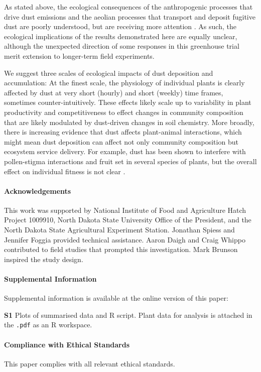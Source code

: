 \documentclass{svjour3}
\begin{document}
As stated above, the ecological consequences of the anthropogenic processes that drive dust emissions and the  aeolian processes that transport and deposit fugitive dust are poorly understood, but are receiving more attention \citep{field2010}. 
As such, the ecological implications of the results demonstrated here are equally unclear, although the unexpected direction of some responses in this greenhouse trial merit extension to longer-term field experiments. 

We suggest three scales of ecological impacts of dust deposition and accumulation: At the finest scale, the physiology of individual plants is clearly affected by dust at very short (hourly) and short (weekly) time frames, sometimes counter-intuitively. 
These effects likely scale up to variability in plant productivity and competitiveness to effect changes in community composition that are likely modulated by dust-driven changes in soil chemistry. 
More broadly, there is increasing evidence that dust affects plant-animal interactions, which might mean dust deposition can affect not only community composition but ecosystem service delivery. 
For example, dust has been shown to interfere with pollen-stigma interactions and fruit set in several species of plants, but the overall effect on individual fitness is not clear \citep{waser2016, zhang2019}. 


\paragraph{Acknowledgements}
This work was supported by National Institute of Food and Agriculture Hatch Project 1009910, North Dakota State University Office of the President, and the North Dakota State Agricultural Experiment Station.
Jonathan Spiess and Jennifer Foggia provided technical assistance. 
Aaron Daigh and Craig Whippo contributed to field studies that prompted this investigation.
Mark Brunson inspired the study design.

\paragraph{Supplemental Information}

Supplemental information is available at the online version of this paper:

\textbf{S1} Plots of summarised data and \textsf{R} script.
Plant data for analysis is attached in the \texttt{.pdf} as an \textsf{R} workspace.

\paragraph{Compliance with Ethical Standards}
This paper complies with all relevant ethical standards. 

      
 
\end{document}
